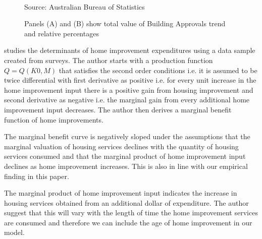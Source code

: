 \begin{figure}[!ht]
\centering
  \  
 \caption{\small{Panels (A) and (B) show total value of Building Approvals trend and relative percentages}}
\label{fig:Total_Value_of_Building_Approvals}
Source: \scriptsize{Australian Bureau of Statistics}
\end{figure}





\citet{boehm1986improvement} studies the determinants of home improvement expenditures using a data sample created from surveys. The author starts with a production function $Q = Q(K0,M)$ that satisfies the second order conditions i.e. it is assumed to be twice differential with first derivative as positive i.e. for every unit increase in the home improvement input there is a positive gain from housing improvement and second derivative as negative i.e. the marginal gain from every additional home improvement input decreases. The author then derives a marginal benefit function of home improvements. 



The marginal benefit curve is negatively sloped under the assumptions that the marginal valuation of housing services declines with the quantity of housing services consumed and that the marginal product of home improvement input declines as home improvement increases. This is also in line with our empirical finding in this paper.  \citet{boehm1986improvement} 

The marginal product of home improvement input indicates the increase in housing services obtained from an additional dollar of expenditure. The author suggest that this will vary with the length of time the home improvement services are consumed and therefore we can include the age of home improvement in our model.

